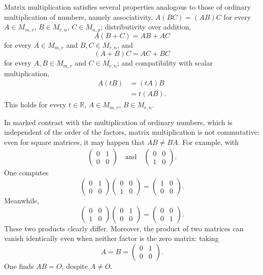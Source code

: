Matrix multiplication satisfies several properties analogous to those of ordinary multiplication of numbers, namely associativity, $A(BC) = (AB)C$ for every $A \in M_{m,r}$, $B \in M_{r,n}$, $C \in M_{n,p}$; distributivity over addition,
\[
A(B+C) = AB + AC
\]
 for every $A \in M_{m,r}$ and $B, C \in M_{r,n}$, and
\[
(A+B)C = AC + BC
\]
 for every $A, B \in M_{m,r}$ and $C \in M_{r,n}$; and compatibility with scalar multiplication,
\[
\begin{aligned}
A(tB) &= (tA)B \\
&= t(AB).
\end{aligned}
\]
This holds for every $t \in \mathbb{R}$, $A \in M_{m,r}$, $B \in M_{r,n}$.

\begin{remark}
In marked contrast with the multiplication of ordinary numbers, which is independent of the order of the factors, matrix multiplication is not commutative: even for square matrices, it may happen that $AB \neq BA$. For example, with
\[
\begin{gathered}
\begin{pmatrix} 0 & 1 \\ 0 & 0 \end{pmatrix} \quad \text{and} \quad
\begin{pmatrix} 0 & 0 \\ 1 & 0 \end{pmatrix}.
\end{gathered}
\]
One computes
\[
\begin{pmatrix} 0 & 1 \\ 0 & 0 \end{pmatrix}\begin{pmatrix} 0 & 0 \\ 1 & 0 \end{pmatrix} = \begin{pmatrix} 1 & 0 \\ 0 & 0 \end{pmatrix}.
\]
Meanwhile,
\[
\begin{pmatrix} 0 & 0 \\ 1 & 0 \end{pmatrix}\begin{pmatrix} 0 & 1 \\ 0 & 0 \end{pmatrix} = \begin{pmatrix} 0 & 0 \\ 0 & 1 \end{pmatrix}.
\]
These two products clearly differ. Moreover, the product of two matrices can vanish identically even when neither factor is the zero matrix: taking
\[
A = B = \begin{pmatrix} 0 & 1 \\ 0 & 0 \end{pmatrix}.
\]
One finds $AB = O$, despite $A \neq O$.
\end{remark}


